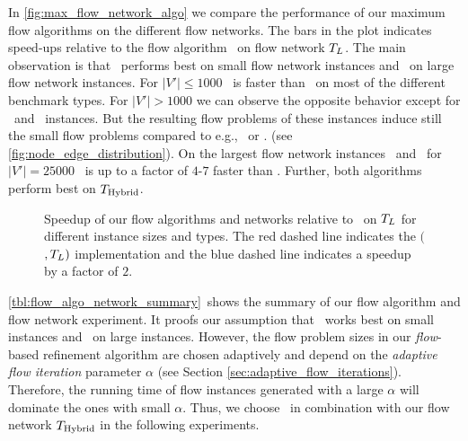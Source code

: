 In \autoref{fig:max_flow_network_algo} we compare the performance of our maximum flow algorithms on the
different flow networks. The bars in the plot indicates speed-ups relative to the flow algorithm
\EdmondKarp~on flow network $T_L$. The main observation is that \EdmondKarp~performs
best on small flow network instances and \GoldbergTarjan~on large flow network instances. For $|V'| \le 1000$
\EdmondKarp~is faster than \GoldbergTarjan~on most of the different benchmark types. For
$|V'| > 1000$ we can observe the opposite behavior except for \DAC~and \Dual~instances. But the
resulting flow problems of these instances induce still the small flow problems compared to e.g.,
\Primal~or \Literal. (see \autoref{fig:node_edge_distribution}). 
On the largest flow network instances \Primal~and \Literal~for $|V'| = 25000$ 
\GoldbergTarjan~is up to a factor of $4$-$7$ faster than \EdmondKarp.
Further, both algorithms perform best on $T_{\text{Hybrid}}$.\\
\begin{figure}
\centering
\caption{Speedup of our flow algorithms and networks relative to \EdmondKarp~on
         $T_L$ for different instance sizes and types. The red dashed line indicates the
         $($\EdmondKarp$,T_L)$ implementation and the blue dashed line
         indicates a speedup by a factor of $2$.}
\label{fig:max_flow_network_algo}
\end{figure} 
\autoref{tbl:flow_algo_network_summary}~shows the summary of our flow algorithm and flow network experiment. 
It proofs our assumption that \EdmondKarp~works best on small instances
and \GoldbergTarjan~on large instances. However, the flow problem sizes in our
\emph{flow}-based refinement algorithm are chosen adaptively and depend on the
\emph{adaptive flow iteration} parameter $\alpha$ (see Section \ref{sec:adaptive_flow_iterations}).
Therefore, the running time of flow instances generated with a large $\alpha$ will dominate the
ones with small $\alpha$. Thus, we choose \GoldbergTarjan~in combination with our flow network
$T_{\text{Hybrid}}$ in the following experiments.
